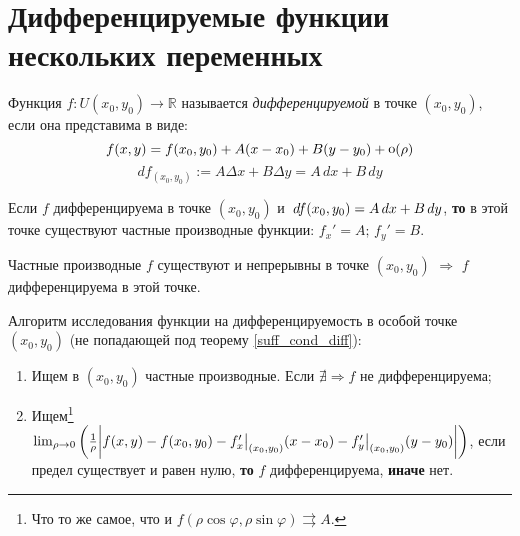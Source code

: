 \section*{Дифференцируемые функции нескольких переменных}
\begin{to_def}
	Функция $f:U(x_0, y_0) \rightarrow \mathbb{R}$ называется \textit{дифференцируемой} в точке $(x_0, y_0)$, если она представима в виде:
	$$f(x,y) = f(x_0, y_0) + A (x - x_0) + B (y - y_0) + \mathop{\mathrm{o}}\nolimits(\rho)$$
	$$d f_(x_0, y_0) := A \Delta x + B \Delta y = A \, dx + B \, d y$$
\end{to_def}

\begin{to_thr}
	Если $f$ дифференцируема в точке $(x_0, y_0)$ и $\, d f (x_0, y_0) = A \, d x + B \, d y$, \textbf{то} в этой точке существуют частные производные функции: $f_x' = A;\, f_y' = B$.
\end{to_thr}


\begin{to_thr}
	Частные производные $f$ существуют и непрерывны в точке $(x_0, y_0)$ $\Rightarrow$ $f$ дифференцируема в этой точке.
	\label{suff_cond_diff}
\end{to_thr}

\noindent Алгоритм исследования функции на дифференцируемость в особой точке $(x_0, y_0)$ (не попадающей под теорему \ref{suff_cond_diff}):
\begin{enumerate}
	\item Ищем в $(x_0, y_0)$ частные производные. Если $ \nexists \Rightarrow f$ не дифференцируема;
	\item Ищем\footnote{
	Что то же самое, что и 
	$f(\rho \cos \varphi, \rho \sin \varphi) \rightrightarrows A$.
	} 
	$ \lim_{\rho \to 0}\left( \frac{1}{\rho} \bigg|f(x, y) - f(x_0, y_0) - f_x'\big|_{(x_0,y_0)} (x - x_0) - f_y'\big|_{(x_0,y_0)} (y - y_0)\bigg|\right)$,
	если предел существует и равен нулю, \textbf{то} $f$ дифференцируема, \textbf{иначе}  нет.
\end{enumerate}